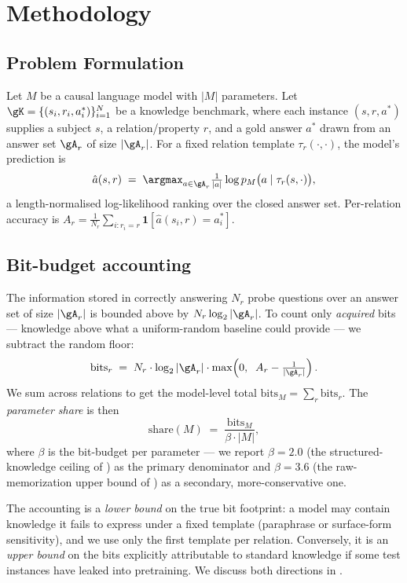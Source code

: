\section{Methodology}
\label{sec:method}

\subsection{Problem Formulation}

Let \(M\) be a causal language model with \(|M|\) parameters. Let \(\gK = \{(s_i, r_i, a_i^*)\}_{i=1}^{N}\) be a knowledge benchmark, where each instance \((s, r, a^*)\) supplies a subject \(s\), a relation/property \(r\), and a gold answer \(a^*\) drawn from an answer set \(\gA_r\) of size \(|\gA_r|\). For a fixed relation template \(\tau_r(\cdot, \cdot)\), the model's prediction is
\[
\hat a(s, r) \;=\; \argmax_{a \in \gA_r} \tfrac{1}{|a|} \log p_M\big(a \mid \tau_r(s, \cdot)\big),
\]
a length-normalised log-likelihood ranking over the closed answer set. Per-relation accuracy is \(A_r = \frac{1}{N_r}\sum_{i: r_i=r} \mathbf{1}[\hat a(s_i, r) = a_i^*]\).

\subsection{Bit-budget accounting}

The information stored in correctly answering \(N_r\) probe questions over an answer set of size \(|\gA_r|\) is bounded above by \(N_r \log_2 |\gA_r|\). To count only \emph{acquired} bits --- knowledge above what a uniform-random baseline could provide --- we subtract the random floor:
\begin{equation}
\text{bits}_r \;=\; N_r \cdot \log_2 |\gA_r| \cdot \max\!\left(0,\;\; A_r - \tfrac{1}{|\gA_r|}\right).
\label{eq:bits}
\end{equation}
We sum across relations to get the model-level total \(\text{bits}_M = \sum_r \text{bits}_r\). The \emph{parameter share} is then
\begin{equation}
\text{share}(M) \;=\; \frac{\text{bits}_M}{\beta \cdot |M|},
\label{eq:share}
\end{equation}
where \(\beta\) is the bit-budget per parameter --- we report \(\beta = 2.0\) (the structured-knowledge ceiling of \citet{allenzhu2024knowledge}) as the primary denominator and \(\beta = 3.6\) (the raw-memorization upper bound of \citet{morris2025memorize}) as a secondary, more-conservative one.

The accounting is a \emph{lower bound} on the true bit footprint: a model may contain knowledge it fails to express under a fixed template (paraphrase or surface-form sensitivity), and we use only the first \bear template per relation. Conversely, it is an \emph{upper bound} on the bits explicitly attributable to standard knowledge if some test instances have leaked into pretraining. We discuss both directions in .

